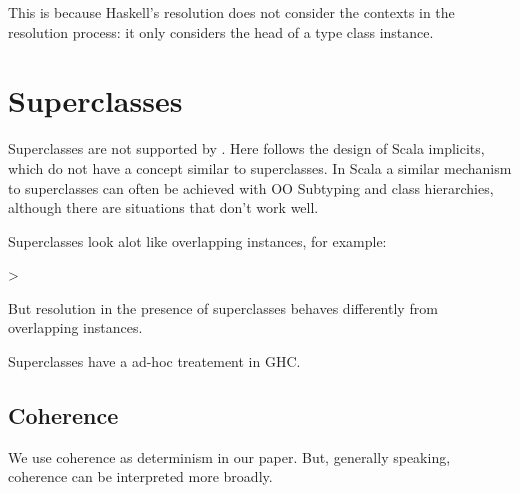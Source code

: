 This is because Haskell's resolution does not consider the contexts in the resolution process:
it only considers the head of a type class instance. 

\section{Superclasses}

Superclasses are not supported by \name. Here \name follows the design of Scala implicits, which 
do not have a concept similar to superclasses. In Scala a similar mechanism to 
superclasses can often be achieved with OO Subtyping and class hierarchies, although there are situations 
that don't work well.  

Superclasses look alot like overlapping instances, for example:

>

But resolution in the presence of superclasses behaves differently from overlapping instances. 

Superclasses have a ad-hoc treatement in GHC. 

\subsection{Coherence}

We use coherence as determinism in our paper. But, generally speaking, coherence can be interpreted
more broadly. 


 